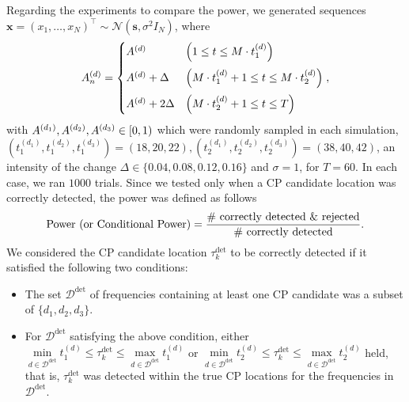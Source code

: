 Regarding the experiments to compare the power, 
we generated sequences $\bm{x}=(x_1, \dots, x_N)^\top \sim \mathcal{N}\left(\bm{s}, \sigma^2 I_N\right)$, 
where
\begin{equation}
  A_n^{(d)} = 
  \begin{cases}
    A^{(d)} & \left(1 \leq t \leq M \cdot t_1^{(d)}\right) \\
    \vspace{-3mm}\\
    A^{(d)} + \Delta & \left(M \cdot t_1^{(d)} + 1 \leq t \leq M \cdot t_2^{(d)}\right) \\
    \vspace{-3mm}\\
    A^{(d)} + 2\Delta & \left(M \cdot t_2^{(d)}+1 \leq t \leq T\right)
  \end{cases}, \notag
\end{equation}
with $A^{(d_1)}, A^{(d_2)}, A^{(d_3)} \in [0,1)$ which were randomly sampled in each simulation, $\left(t_1^{(d_1)}, t_1^{(d_2)}, t_1^{(d_3)}\right) = (18, 20, 22), \left(t_2^{(d_1)}, t_2^{(d_2)}, t_2^{(d_3)}\right) = (38, 40, 42)$, an intensity of the change $\Delta \in \{0.04, 0.08, 0.12, 0.16\}$ and $\sigma=1$, for $T=60$.
In each case, we ran $1000$ trials. 
Since we tested only when a CP candidate location was correctly detected, the power was defined as follows
\begin{equation}
  \text{Power (or Conditional Power)} = \frac{\# \text{ correctly detected \& rejected}}{\# \text{ correctly detected}}. \notag
\end{equation}
We considered the CP candidate location $\tau_k^{\text{det}}$ to be correctly detected if it satisfied the following two conditions:
\vspace{-3mm}
\begin{itemize}
\item The set $\mathcal{D}^{\text{det}}$ of frequencies containing at least one CP candidate was a subset of $\{d_1, d_2, d_3\}$.
\vspace{-2mm}
\item For $\mathcal{D}^{\text{det}}$ satisfying the above condition, either $\underset{d \in \mathcal{D}^{\text{det}}}{\min}{t_1^{(d)}} \leq \tau_k^{\text{det}} \leq \underset{d \in \mathcal{D}^{\text{det}}}{\max} {t_1^{(d)}}$ or $\underset{d \in \mathcal{D}^{\text{det}}}{\min}{t_2^{(d)}} \leq \tau_k^{\text{det}} \leq \underset{d \in \mathcal{D}^{\text{det}}}{\max} {t_2^{(d)}}$ held, 
      that is, $\tau_k^{\text{det}}$ was detected within the true CP locations for the frequencies in $\mathcal{D}^{\text{det}}$.
\end{itemize}
\vspace{-3mm}

